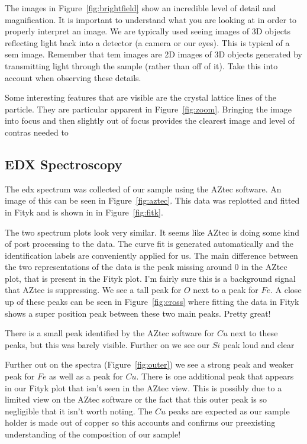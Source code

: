 \documentclass[12pt,a4paper]{article}
\begin{document}
The images in Figure~\ref{fig:brightfield} show an incredible level of detail and magnification.  It is important to understand what you are looking at in order to properly interpret an image.  We are typically used seeing images of 3D objects reflecting light back into a detector (a camera or our eyes).  This is typical of a \ac{sem} image.  Remember that \ac{tem} images are 2D images of 3D objects generated by transmitting light through the sample (rather than off of it).  Take this into account when observing these details.

Some interesting features that are visible are the crystal lattice lines of the particle.  They are particular apparent in Figure~\ref{fig:zoom}.  Bringing the image into focus and then slightly out of focus provides the clearest image and level of contras needed to 


\subsection{EDX Spectroscopy} %
\label{sub:edx_spectroscopy}

The \ac{edx} spectrum was collected of our sample using the AZtec software.  An image of this can be seen in Figure~\ref{fig:aztec}.  This data was replotted and fitted in Fityk and is shown in in Figure~\ref{fig:fitk}.  

The two spectrum plots look very similar.  It seems like AZtec is doing some kind of post processing to the data.  The curve fit is generated automatically and the identification labels are conveniently applied for us.  The main difference between the two representations of the data is the peak missing around 0 in the AZtec plot, that is present in the Fityk plot.  I'm fairly sure this is a background signal that AZtec is suppressing.  We see a tall peak for $O$ next to a peak for $Fe$.  A close up of these peaks can be seen in Figure~\ref{fig:cross} where fitting the data in Fityk shows a super position peak between these two main peaks.  Pretty great!  

There is a small peak identified by the AZtec software for $Cu$ next to these peaks, but this was barely   visible.  Further on we see our $Si$ peak loud and clear

Further out on the spectra (Figure~\ref{fig:outer}) we see a strong peak and weaker peak for $Fe$ as well as a peak for $Cu$.  There is one additional peak that appears in our Fityk plot that isn't seen in the AZtec view.  This is possibly due to a limited view on the AZtec software or the fact that this outer peak is so negligible that it isn't worth noting.  The $Cu$ peaks are expected as our sample holder is made out of copper so this accounts and confirms our preexisting understanding of the composition of our sample!
\end{document}
